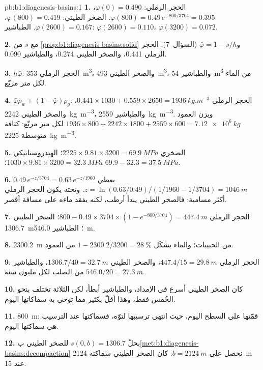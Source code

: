 \begin{solution}{pb:b1:diagenesis-basins:1}
\textbf{1.} الحجر الرملي: $\varphi(0) = \num{0.490}$، $\varphi(800) =
0.49\,e^{-800/3704} = \num{0.395}$. الصخر الطيني: $\varphi(800) = \num{0.419}$،
$\varphi(2600) = \num{0.167}$. الطباشير: $\varphi(2600) = \num{0.110}$،
$\varphi(3200) = \num{0.072}$.

\textbf{2.} مع $s$ من \cref{prop:b1:diagenesis-basins:solid} و$\bar\varphi
= 1 - s/h$ (السؤال~7): الحجر الرملي \num{0.441}، والصخر الطيني \num{0.274}، والطباشير
\num{0.090}.

\textbf{3.} $h\bar\varphi$: الحجر الرملي \qty{353}{m^3}، والصخر الطيني \qty{493}{m^3}، والطباشير
\qty{54}{m^3} من الماء لكل متر مربّع.

\textbf{4.} $\bar\varphi\rho_w + (1 - \bar\varphi)\rho_g$: الحجر الرملي
$0.441\times1030 + 0.559\times2650 = \qty{1936}{kg.m^{-3}}$، والصخر الطيني
\qty{2242}{kg.m^{-3}}، والطباشير \qty{2559}{kg.m^{-3}}. ويزن العمود
$1936\times800 + 2242\times1800 + 2559\times600 = \qty{7.12e6}{kg}$ لكل متر مربّع:
كثافة متوسطة \qty{2225}{kg.m^{-3}}.

\textbf{5.} الصخري $2225\times9.81\times3200 = \qty{69.9}{MPa}$؛ الهيدروستاتيكي
$1030\times9.81\times3200 = \qty{32.3}{MPa}$؛ 
$69.9 - 32.3 = \qty{37.5}{MPa}$.

\textbf{6.} $0.49\,e^{-z/3704} = 0.63\,e^{-z/1960}$ يعطي $z = \ln(0.63/0.49)
/(1/1960 - 1/3704) = \qty{1046}{m}$. وتحته يكون الحجر الرملي أكثر مسامية: فالصخر
الطيني يبدأ أرطب، لكنه يفقد ماءه على مسافة أقصر.

\textbf{7.} الحجر الرملي $800 - 0.49\times3704\times(1 - e^{-800/3704}) =
\qty{447.4}{m}$؛ الصخر الطيني \qty{1306.7}{m}؛ الطباشير \qty{546.0}{m}.

\textbf{8.} \qty{2300.2}{m} من الحبيبات؛ والماء يشكّل $1 - 2300.2/3200 =
\qty{28}{\%}$ من العمود.

\textbf{9.} الحجر الرملي $447.4/15 = \qty{29.8}{m}$، والصخر الطيني $1306.7/40 =
\qty{32.7}{m}$، والطباشير $546.0/20 = \qty{27.3}{m}$ من الصلب لكل مليون سنة.

\textbf{10.} كان الصخر الطيني أسرع في الإمداد، والطباشير أبطأ، لكن الثلاثة تختلف بنحو
الخُمس فقط، وهذا أقلّ بكثير مما توحي به سماكاتها اليوم.

\textbf{11.} \qty{800}{m}: قمّتها على السطح اليوم، حيث انتهى ترسيبها لتوّه، فسماكتها عند الترسيب هي سماكتها اليوم.

\textbf{12.} بحلّ $s(0, b) = 1306.7$ للصخر الطيني ب\cref{met:b1:diagenesis-basins:decompaction} نحصل على $b = \qty{2124}{m}$: كان الصخر الطيني سماكته \qty{2124}{m} عند \qty{15}{\Ma}.


\end{solution}
